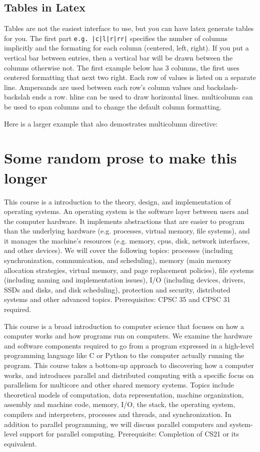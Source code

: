 \documentclass[twocolumn]{article}
\begin{document}
\subsection {Tables in Latex }

Tables are not the easiest interface to use, but you can have latex generate tables for you.
The first part {\tt e.g. |c|l|r|rr|} specifies the number of columns implicitly
and the formating for each column (centered, left, right).  If you put a 
vertical bar between entries, then a vertical bar will be drawn between the
columns otherwise not.  The first example below has 3 columns, the first
uses centered formatting that next two right.  Each row of values is
listed on a separate line.  Ampersands are used between each row's column 
values and backslash-backslah ends a row.   hline can be used to draw
horizontal lines.  multicolumn can be used to span columns and to
change the default column formatting.



Here is a larger example that also demostrates multicolumn directive:




\section {Some random prose to make this longer}

This course is a introduction to the theory, design, and implementation of operating systems. An operating system is the software layer between users and the computer hardware. It implements abstractions that are easier to program than the underlying hardware (e.g. processes, virtual memory, file systems), and it manages the machine's resources (e.g. memory, cpus, disk, network interfaces, and other devices). We will cover the following topics: processes (including synchronization, communication, and scheduling), memory (main memory allocation strategies, virtual memory, and page replacement policies), file systems (including naming and implementation issues), I/O (including devices, drivers, SSDs and disks, and disk scheduling), protection and security, distributed systems and other advanced topics. Prerequisites: CPSC 35 and CPSC 31 required. 

This course is a broad introduction to computer science that focuses on how a computer works and how programs run on computers. We examine the hardware and software components required to go from a program expressed in a high-level programming language like C or Python to the computer actually running the program. This course takes a bottom-up approach to discovering how a computer works, and introduces parallel and distributed computing with a specific focus on parallelism for multicore and other shared memory systems. Topics include theoretical models of computation, data representation, machine organization, assembly and machine code, memory, I/O, the stack, the operating system, compilers and interpreters, processes and threads, and synchronization. In addition to parallel programming, we will discuss parallel computers and system-level support for parallel computing. Prerequisite: Completion of CS21 or its equivalent.
\end{document}
